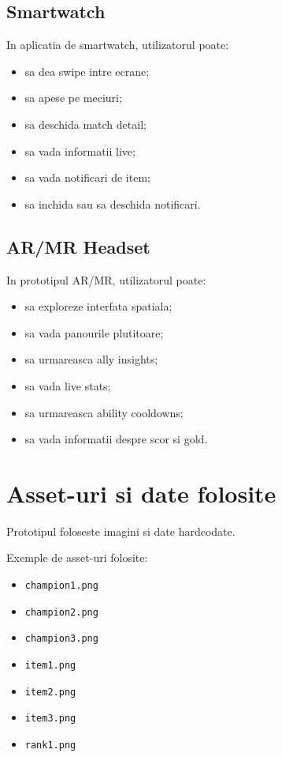 \documentclass[12pt,a4paper]{article}
\begin{document}
\subsection{Smartwatch}

In aplicatia de smartwatch, utilizatorul poate:

\begin{itemize}
    \item sa dea swipe intre ecrane;
    \item sa apese pe meciuri;
    \item sa deschida match detail;
    \item sa vada informatii live;
    \item sa vada notificari de item;
    \item sa inchida sau sa deschida notificari.
\end{itemize}

\subsection{AR/MR Headset}

In prototipul AR/MR, utilizatorul poate:

\begin{itemize}
    \item sa exploreze interfata spatiala;
    \item sa vada panourile plutitoare;
    \item sa urmareasca ally insights;
    \item sa vada live stats;
    \item sa urmareasca ability cooldowns;
    \item sa vada informatii despre scor si gold.
\end{itemize}

\section{Asset-uri si date folosite}

Prototipul foloseste imagini si date hardcodate.

Exemple de asset-uri folosite:

\begin{itemize}
    \item \texttt{champion1.png}
    \item \texttt{champion2.png}
    \item \texttt{champion3.png}
    \item \texttt{item1.png}
    \item \texttt{item2.png}
    \item \texttt{item3.png}
    \item \texttt{rank1.png}
\end{itemize}
\end{document}
